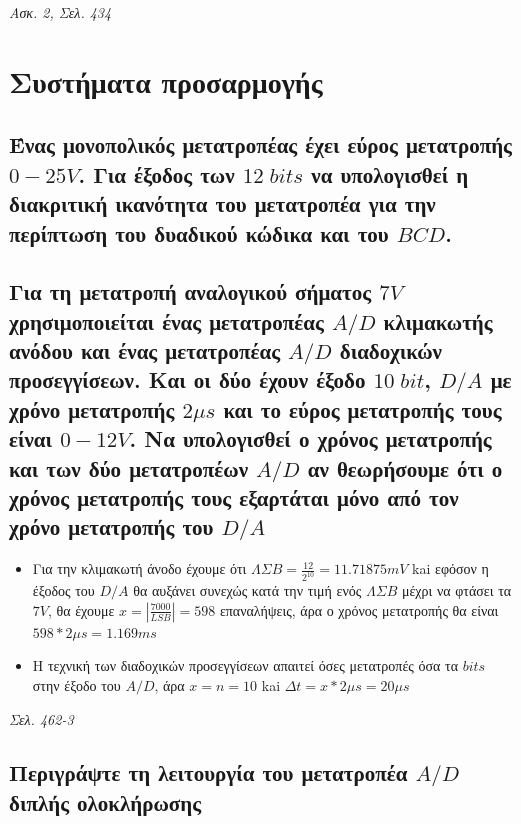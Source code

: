 \documentclass{article}
\begin{document}
\emph{Ασκ. 2, Σελ. 434}

\section{Συστήματα προσαρμογής}
\subsection{Ένας μονοπολικός μετατροπέας έχει εύρος μετατροπής $0-25V$. Για έξοδος των $12\; bits$ να υπολογισθεί η διακριτική ικανότητα του μετατροπέα για την περίπτωση 
του δυαδικού κώδικα και του $BCD$.}

\subsection{Για τη μετατροπή αναλογικού σήματος $7V$ χρησιμοποιείται ένας μετατροπέας $A/D$ κλιμακωτής ανόδου και ένας μετατροπέας $Α/D$ διαδοχικών προσεγγίσεων. Και οι δύο έχουν έξοδο 
$10\; bit$, $D/A$ με χρόνο μετατροπής $2\mu s$ και το εύρος μετατροπής τους είναι $0-12V$. Να υπολογισθεί ο χρόνος μετατροπής και των δύο μετατροπέων $A/D$ αν θεωρήσουμε ότι ο χρόνος
μετατροπής τους εξαρτάται μόνο από τον χρόνο μετατροπής του $D/A$}
    
\begin{itemize}
    \item Για την κλιμακωτή άνοδο έχουμε ότι $ΛΣΒ = \frac{12}{2^{10}} = 11.71875mV$ kai εφόσον η έξοδος του $D/A$ θα αυξάνει συνεχώς κατά την τιμή ενός $ΛΣΒ$ μέχρι να φτάσει τα $7V$, 
        θα έχουμε $x = |\frac{7000}{LSB}| = 598$ επαναλήψεις, άρα ο χρόνος μετατροπής θα είναι $598*2\mu s = 1.169ms$
    \item Η τεχνική των διαδοχικών προσεγγίσεων απαιτεί όσες μετατροπές όσα τα $bits$ στην έξοδο του $A/D$, άρα $x = n = 10$ kai $\Delta t = x * 2\mu s = 20\mu s$
\end{itemize}
\emph{Σελ. 462-3}

\subsection{Περιγράψτε τη λειτουργία του μετατροπέα $A/D$ διπλής ολοκλήρωσης}
\newpage
\end{document}
